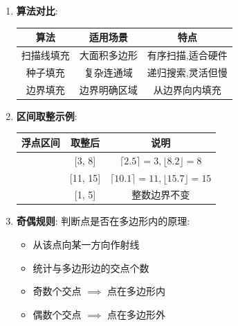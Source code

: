 \documentclass[UTF8]{ctexart}
\begin{document}
\begin{enumerate}
    \item \textbf{算法对比}:
    \begin{center}
    \begin{tabular}{ccc}
    \toprule 算法 & 适用场景 & 特点 \\ \midrule
    扫描线填充 & 大面积多边形 & 有序扫描,适合硬件 \\
    种子填充 & 复杂连通域 & 递归搜索,灵活但慢 \\
    边界填充 & 边界明确区域 & 从边界向内填充 \\ \bottomrule
    \end{tabular}
    \end{center}
    
    \item \textbf{区间取整示例}:
    \begin{center}
    \begin{tabular}{ccc}
    \toprule 浮点区间 & 取整后 & 说明 \\ \midrule
    [2.5, 8.2] & [3, 8] & $\lceil 2.5 \rceil=3, \lfloor 8.2 \rfloor=8$ \\
    [10.1, 15.7] & [11, 15] & $\lceil 10.1 \rceil=11, \lfloor 15.7 \rfloor=15$ \\
    [1.0, 5.0] & [1, 5] & 整数边界不变 \\ \bottomrule
    \end{tabular}
    \end{center}
    
    \item \textbf{奇偶规则}: 判断点是否在多边形内的原理:
    \begin{itemize}
        \item 从该点向某一方向作射线
        \item 统计与多边形边的交点个数
        \item 奇数个交点 $\implies$ 点在多边形内
        \item 偶数个交点 $\implies$ 点在多边形外
    \end{itemize}
\end{enumerate}
\end{document}
